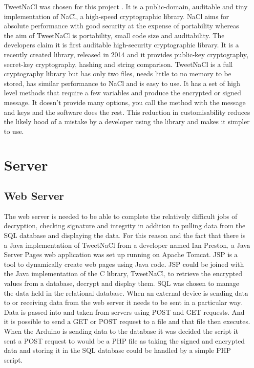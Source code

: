 
TweetNaCl was chosen for this project \cite{tweetdl}. It is a public-domain, auditable and tiny implementation of NaCl, a high-speed cryptographic library. NaCl aims for absolute performance with good security at the expense of portability whereas the aim of TweetNaCl is portability, small code size and auditability. The developers claim it is first auditable high-security cryptographic library. It is a recently created library, released in 2014 and it provides public-key cryptography, secret-key cryptography, hashing and string comparison. TweetNaCl is a full cryptography library but has only two files, needs little to no memory to be stored, has similar performance to NaCl and is easy to use. It has a set of high level methods that require a few variables and produce the encrypted or signed message. It doesn't provide many options, you call the method with the message and keys and the software does the rest. This reduction in customisability reduces the likely hood of a mistake by a developer using the library and makes it simpler to use.


\section{Server}

\subsection{Web Server}

The web server is needed to be able to complete the relatively difficult jobs of decryption, checking signature and integrity in addition to pulling data from the SQL database and displaying the data. For this reason and the fact that there is a Java implementation of TweetNaCl from a developer named Ian Preston, a Java Server Pages web application was set up running on Apache Tomcat. JSP is a tool to dynamically create web pages using Java code. JSP could be joined with the Java implementation of the C library, TweetNaCl, to retrieve the encrypted values from a database, decrypt and display them. SQL was chosen to manage the data held in the relational database. When an external device is sending data to or receiving data from the web server it needs to be sent in a particular way. Data is passed into and taken from servers using POST and GET requests. And it is possible to send a GET or POST request to a file and that file then executes. When the Arduino is sending data to the database it was decided the script it sent a POST request to would be a PHP file as taking the signed and encrypted data and storing it in the SQL database could be handled by a simple PHP script.

